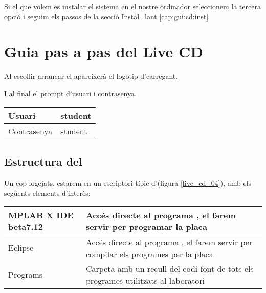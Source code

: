 Si el que volem es instalar el sistema en el nostre ordinador seleccionem la tercera opció i seguim els passos de la secció Instal·lant \ref{cap:gui:cd:inst}

\section{Guia pas a pas del Live CD}\label{cap:gui:cd:pas}

Al escollir arrancar el \LiveCD apareixerà el logotip d'\Ubuntu carregant.

I al final el prompt d'usuari i contrasenya.

\begin{center}
	\begin{tabular}{l | l}
		Usuari & student \\
		\hline
		Contrasenya & student \\
		\hline
	\end{tabular}
	\label{tab:gui:cd:usr:pass}
\end{center}


\subsection{Estructura del \LiveCD}\label{cap:gui:cd:struct}

Un cop logejats, estarem en un escriptori típic d'\Ubuntu (figura \ref{live_cd_04}), amb els següents elements d'interès:

\begin{center}
	\begin{tabularx}{\linewidth}{l | X}
		MPLAB X IDE beta7.12 &  Accés directe al programa \MplabX, el farem servir per programar la placa \FLEX\\
		\hline
		Eclipse & Accés directe al programa \Eclipse, el farem servir per compilar els programes per la placa \FLEX\\
		\hline
		Programs & Carpeta amb un recull del codi font de tots els programes utilitzats al laboratori  \\
	\end{tabularx}
	\label{tab:gui:cd:desk}
\end{center}

